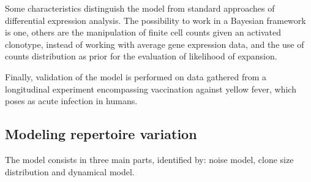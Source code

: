 \documentclass[a4paper,twocolumn]{article}
\begin{document}
Some characteristics distinguish the model from standard approaches of differential expression analysis. The possibility to work in a Bayesian framework is one, others are the manipulation of finite cell counts given an activated clonotype, instead of working with average gene expression data, and the use of counts distribution as prior for the evaluation of likelihood of expansion.

Finally, validation of the model is performed on data gathered from a longitudinal experiment encompassing vaccination against yellow fever, which poses as acute infection in humans.

\subsection{Modeling repertoire variation}
The model consists in three main parts, identified by: noise model, clone size distribution and dynamical model.
\end{document}
